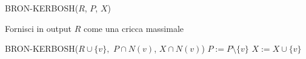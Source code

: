 \begin{algorithm}[H]
    \caption{BRON-KERBOSH($R$, $P$, $X$)}\label{alg:bk1}
    \begin{algorithmic}[1]
            \State Fornisci in output $R$ come una cricca massimale
        \Else

                \State BRON-KERBOSH($R \cup \{v\},$ $P \cap N(v)$, $X \cap N(v)$)
                \State $P:= P \setminus \{v\}$
                \State $X:= X \cup \{v\}$
            \EndFor
        \EndIf
    \end{algorithmic}
\end{algorithm}